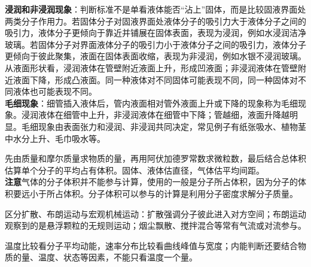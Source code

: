 \begin{keypointbox}[title={\strut\textcolor{white}{\bfseries 重点知识点：速率分布与内能}}]
\textbf{浸润和非浸润现象}：判断标准不是单看液体能否“沾上”固体，而是比较固液界面处两类分子作用力。若固体分子对固液界面处液体分子的吸引力大于液体分子之间的吸引力，液体分子更倾向于靠近并铺展在固体表面，表现为浸润，例如水浸润洁净玻璃。若固体分子对界面液体分子的吸引力小于液体分子之间的吸引力，液体分子更倾向于彼此聚集，液面在固体表面收缩，表现为非浸润，例如水银不浸润玻璃。\\

从液面形状看，浸润液体在管壁附近液面上升，形成凹液面；非浸润液体在管壁附近液面下降，形成凸液面。同一种液体对不同固体可能表现不同，同一种固体对不同液体也可能表现不同。\\

\textbf{毛细现象}：细管插入液体后，管内液面相对管外液面上升或下降的现象称为毛细现象。浸润液体在细管中上升，非浸润液体在细管中下降；管越细，液面升降越明显。毛细现象由表面张力和浸润、非浸润共同决定，常见例子有纸张吸水、植物茎中水分上升、毛巾吸水等。

\end{keypointbox}

\begin{casetypebox}[title={\strut\textcolor{white}{\bfseries 常见题型：分子数量与尺度估算}}]
先由质量和摩尔质量求物质的量，再用阿伏加德罗常数求微粒数，最后结合总体积估算单个分子的平均占有体积。固体、液体估直径，气体估平均间距。\\
\textbf{注意}气体的分子体积并不能参与计算，使用的一般是分子所占体积，因为分子的体积要远小于所占体积。分子体积可以参与的计算是利用分子密度求解分子质量。
\end{casetypebox}

\begin{casetypebox}[title={\strut\textcolor{white}{\bfseries 常见题型：热运动现象辨析}}]
区分扩散、布朗运动与宏观机械运动：扩散强调分子彼此进入对方空间；布朗运动观察到的是悬浮颗粒的无规则运动；烟尘飘散、搅拌混合等常有气流或对流参与。
\end{casetypebox}

\begin{casetypebox}[title={\strut\textcolor{white}{\bfseries 常见题型：温度、内能与速率分布判断}}]
温度比较看分子平均动能，速率分布比较看曲线峰值与宽度；内能判断还要结合物质的量、温度、状态等因素，不能只看温度一个量。
\end{casetypebox}

